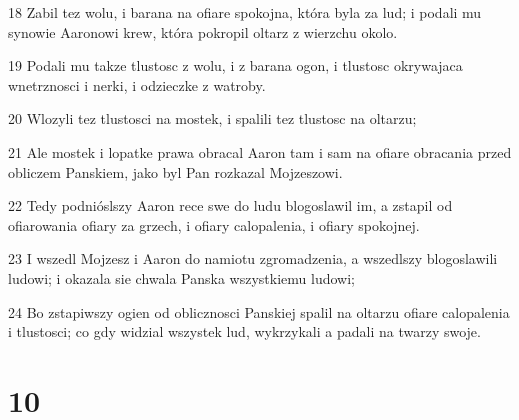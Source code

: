 \par 18 Zabil tez wolu, i barana na ofiare spokojna, która byla za lud; i podali mu synowie Aaronowi krew, która pokropil oltarz z wierzchu okolo.
\par 19 Podali mu takze tlustosc z wolu, i z barana ogon, i tlustosc okrywajaca wnetrznosci i nerki, i odzieczke z watroby.
\par 20 Wlozyli tez tlustosci na mostek, i spalili tez tlustosc na oltarzu;
\par 21 Ale mostek i lopatke prawa obracal Aaron tam i sam na ofiare obracania przed obliczem Panskiem, jako byl Pan rozkazal Mojzeszowi.
\par 22 Tedy podnióslszy Aaron rece swe do ludu blogoslawil im, a zstapil od ofiarowania ofiary za grzech, i ofiary calopalenia, i ofiary spokojnej.
\par 23 I wszedl Mojzesz i Aaron do namiotu zgromadzenia, a wszedlszy blogoslawili ludowi; i okazala sie chwala Panska wszystkiemu ludowi;
\par 24 Bo zstapiwszy ogien od oblicznosci Panskiej spalil na oltarzu ofiare calopalenia i tlustosci; co gdy widzial wszystek lud, wykrzykali a padali na twarzy swoje.

\chapter{10}

